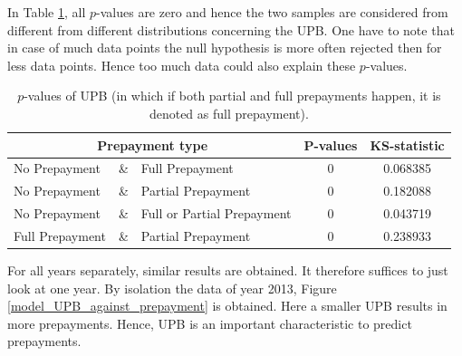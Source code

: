         In Table \ref{model_Pvals_of_UPB}, all $p$-values are zero and hence 
        the two samples are considered from different from different 
        distributions concerning the UPB. One have to note that in case of much data points 
        the null hypothesis is more often rejected then for less data points. 
        Hence too much data could also explain these $p$-values. 
        \begin{table}[H]
        \centering
            \begin{tabular}{lcl|c|c}
                \multicolumn{3}{c|}{Prepayment type} 
                & P-values& KS-statistic \\\hline
                No Prepayment & \& & Full Prepayment & 0 & 0.068385\\
                No Prepayment & \& & Partial Prepayment & 0 & 0.182088\\
                No Prepayment & \& & Full or Partial Prepayment & 0 & 0.043719 \\
                Full Prepayment & \& & Partial Prepayment & 0 & 0.238933
		    \end{tabular}
            \caption{
                $p$-values of UPB (in which if both partial and full 
                prepayments happen, it is denoted as full prepayment).
                }
	        \label{model_Pvals_of_UPB}
        \end{table}
        For all years separately, similar results are obtained.
        It therefore suffices to just look at one year.  
        By isolation the data of year 2013, Figure 
        \ref{model_UPB_against_prepayment} is obtained. Here a smaller 
        UPB results in more prepayments. Hence, UPB is an 
        important characteristic to predict prepayments. 
